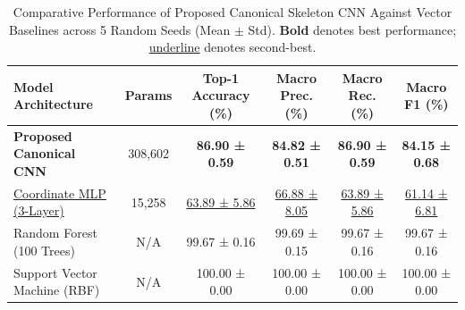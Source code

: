 \begin{table}[t]
\centering
\caption{Comparative Performance of Proposed Canonical Skeleton CNN Against Vector Baselines across 5 Random Seeds (Mean $\pm$ Std). \textbf{Bold} denotes best performance; \underline{underline} denotes second-best.}
\label{tab:main_results}
\begin{tabular}{lccccc}
\toprule
\textbf{Model Architecture} & \textbf{Params} & \textbf{Top-1 Accuracy (\%)} & \textbf{Macro Prec. (\%)} & \textbf{Macro Rec. (\%)} & \textbf{Macro F1 (\%)} \\
\midrule
\textbf{Proposed Canonical CNN} & 308,602 & \textbf{86.90 ± 0.59} & \textbf{84.82 ± 0.51} & \textbf{86.90 ± 0.59} & \textbf{84.15 ± 0.68} \\
\underline{Coordinate MLP (3-Layer)} & 15,258 & \underline{63.89 ± 5.86} & \underline{66.88 ± 8.05} & \underline{63.89 ± 5.86} & \underline{61.14 ± 6.81} \\
Random Forest (100 Trees) & N/A & 99.67 ± 0.16 & 99.69 ± 0.15 & 99.67 ± 0.16 & 99.67 ± 0.16 \\
Support Vector Machine (RBF) & N/A & 100.00 ± 0.00 & 100.00 ± 0.00 & 100.00 ± 0.00 & 100.00 ± 0.00 \\
\bottomrule
\end{tabular}
\end{table}

